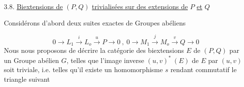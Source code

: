 

3.8. \underline{Biextensions de} $(P,Q)$ \underline{trivialisées sur des extensions de} $P$ \underline{et} $Q$

Considérons d'abord deux suites exactes de Groupes abéliens

\begin{equation}\tag{3.8.1}
0 \longrightarrow L_1 \xrightarrow{\ i\ } L_o \xrightarrow{\ u\ } P \longrightarrow 0 \ , \ 0 \longrightarrow M_1 \xrightarrow{\ j\ } M_o \xrightarrow{\ v\ } Q \longrightarrow 0
\end{equation}
Nous nous proposons de décrire la catégorie des biextensions $E$ de $(P,Q)$ par un Groupe abélien $G$, telles que l'image inverse $(u,v)^{*}\ (E)$ de $E$ par $(u,v)$ soit triviale, i.e. telles qu'il existe un homomorphisme $s$ rendant commutatif le triangle suivant

